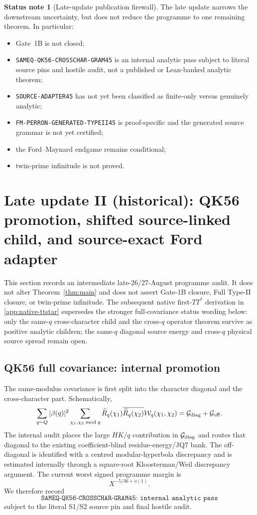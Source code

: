 \documentclass[11pt]{article}
\theoremstyle{definition}
\newtheorem{status}[status]{Status note}
\newcommand{\1}{\mathbf 1}
\begin{document}
\begin{status}[Late-update publication firewall]
The late update narrows the downstream uncertainty, but does not reduce the
programme to one remaining theorem.  In particular:
\begin{itemize}
  \item Gate~1B is not closed;
  \item \texttt{SAMEQ-QK56-CROSSCHAR-GRAM45} is an internal analytic pass
        subject to literal source pins and hostile audit, not a published or
        Lean-banked analytic theorem;
  \item \texttt{SOURCE-ADAPTER45} has not yet been classified as finite-only
        versus genuinely analytic;
  \item \texttt{FM-PERRON-GENERATED-TYPEII45} is proof-specific and the
        generated source grammar is not yet certified;
  \item the Ford--Maynard endgame remains conditional;
  \item twin-prime infinitude is not proved.
\end{itemize}
\end{status}


\section{Late update II (historical): QK56 promotion, shifted source-linked child, and source-exact Ford adapter}
\label{app:late-update-II}

This section records an intermediate late-26/27-August programme audit.  It
does not alter Theorem~\ref{thm:main} and does not assert Gate-1B closure, Full
Type-II closure, or twin-prime infinitude.  The subsequent native first-$TT^*$
derivation in \cref{app:native-ttstar} supersedes the stronger full-covariance
status wording below: only the same-$q$ cross-character child and the
cross-$q$ operator theorem survive as positive analytic children; the
same-$q$ diagonal source energy and cross-$q$ physical source spread remain
open.

\subsection{QK56 full covariance: internal promotion}
The same-modulus covariance is first split into the character diagonal and the
cross-character part.  Schematically,
\[
 \sum_{q\sim Q}|\beta(q)|^2
 \sum_{\chi_1,\chi_2\bmod q}
 \widehat R_q(\chi_1)\overline{\widehat R_q(\chi_2)}
 \mathcal W_q(\chi_1,\chi_2)
 =\mathcal G_{\rm diag}+\mathcal G_{\rm off}.
\]
The internal audit places the large $HK/q$ contribution in
$\mathcal G_{\rm diag}$ and routes that diagonal to the existing
coefficient-blind residue-energy/JQ7 bank.  The off-diagonal is identified with
a centred modular-hyperbola discrepancy and is estimated internally through a
square-root Kloosterman/Weil discrepancy argument.  The current worst signed
programme margin is
\[
       X^{-5/36+o(1)}.
\]
We therefore record
\[
 \boxed{\texttt{SAMEQ-QK56-CROSSCHAR-GRAM45: internal analytic pass}}
\]
subject to the literal S1/S2 source pin and final hostile audit.
\end{document}
